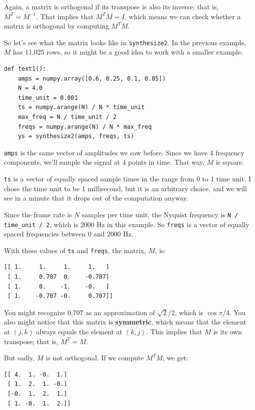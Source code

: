 \documentclass[12pt]{book}
\begin{document}
Again, a matrix is orthogonal
if its transpose is also
its inverse; that is, $M^T = M^{-1}$.  That implies that $M^TM = I$,
which means we can check whether a matrix is orthogonal by computing
$M^TM$.

So let's see what the matrix looks like in {\tt synthesize2}.  In 
the previous example, $M$ has 11,025 rows, so it might be a good idea
to work with a smaller example:

\begin{verbatim}
def test1():
    amps = numpy.array([0.6, 0.25, 0.1, 0.05])
    N = 4.0
    time_unit = 0.001
    ts = numpy.arange(N) / N * time_unit
    max_freq = N / time_unit / 2
    freqs = numpy.arange(N) / N * max_freq
    ys = synthesize2(amps, freqs, ts)
\end{verbatim}

{\tt amps} is the same vector of amplitudes we saw before.
Since we have 4 frequency components, we'll sample the signal
at 4 points in time.  That way, $M$ is square.

{\tt ts} is a vector of equally spaced sample times in the range from
0 to 1 time unit.  I chose the time unit to be 1 millisecond, but it
is an arbitrary choice, and we will see in a minute that it drops out
of the computation anyway.

Since the frame rate is $N$ samples per time unit, the Nyquist
frequency is \verb"N / time_unit / 2", which is 2000 Hz in this
example.  So {\tt freqs} is a vector of equally spaced frequencies
between 0 and 2000 Hz.

With these values of {\tt ts} and {\tt freqs}, the matrix, $M$, is:

\begin{verbatim}
[[ 1.     1.     1.     1.   ]
 [ 1.     0.707  0.    -0.707]
 [ 1.     0.    -1.    -0.   ]
 [ 1.    -0.707 -0.     0.707]]
\end{verbatim}

You might recognize 0.707 as an approximation of $\sqrt{2}/2$,
which is $\cos \pi/4$.  You also might notice that this matrix
is {\bf symmetric}, which means that the element at $(j, k)$ always
equals the element at $(k, j)$.  This implies that $M$ is its own
transpose; that is, $M^T = M$.

But sadly, $M$ is not orthogonal.  If we compute $M^TM$, we get:

\begin{verbatim}
[[ 4.  1. -0.  1.]
 [ 1.  2.  1. -0.]
 [-0.  1.  2.  1.]
 [ 1. -0.  1.  2.]]
\end{verbatim}
\end{document}
